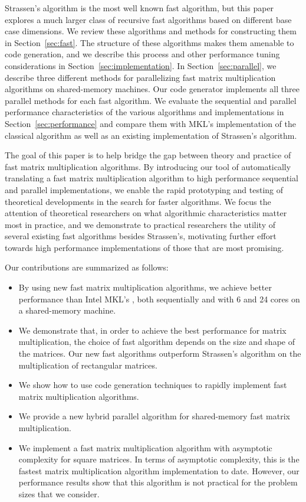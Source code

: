 \documentclass[preprint]{sigplanconf}
\begin{document}
Strassen's algorithm is the most well known fast algorithm, but this paper explores a much larger class of recursive fast algorithms based on different base case dimensions.
We review these algorithms and methods for constructing them in Section~\ref{sec:fast}.
The structure of these algorithms makes them amenable to code generation, and we describe this process and other performance tuning considerations in Section~\ref{sec:implementation}.
In Section~\ref{sec:parallel}, we describe three different methods for parallelizing fast matrix multiplication algorithms on shared-memory machines.
Our code generator implements all three parallel methods for each fast algorithm.
We evaluate the sequential and parallel performance characteristics of the various algorithms and implementations in Section~\ref{sec:performance} and compare them with MKL's implementation of the classical algorithm as well as an existing implementation of Strassen's algorithm.

The goal of this paper is to help bridge the gap between theory and practice of fast matrix multiplication algorithms.
By introducing our tool of automatically translating a fast matrix multiplication algorithm to high performance sequential and parallel implementations, we enable the rapid prototyping and testing of theoretical developments in the search for faster algorithms.
We focus the attention of theoretical researchers on what algorithmic characteristics matter most in practice, and we demonstrate to practical researchers the utility of several existing fast algorithms besides Strassen's, motivating further effort towards high performance implementations of those that are most promising.

Our contributions are summarized as follows:
\begin{itemize}
\item 
By using new fast matrix multiplication algorithms, we achieve better performance than Intel MKL's , both sequentially and with 6 and 24 cores on a shared-memory machine.

\item 
We demonstrate that, in order to achieve the best performance for matrix multiplication, the choice of fast algorithm depends on the size and shape of the matrices.
Our new fast algorithms outperform Strassen's algorithm on the multiplication of rectangular matrices.

\item
We show how to use code generation techniques to rapidly implement fast matrix multiplication algorithms.

\item
We provide a new hybrid parallel algorithm for shared-memory fast matrix multiplication.

\item
We implement a fast matrix multiplication algorithm with asymptotic complexity  for square  matrices.
In terms of asymptotic complexity, this is the fastest matrix multiplication algorithm implementation to date.
However, our performance results show that this algorithm is not practical for the problem sizes that we consider.



\end{itemize}
\end{document}
